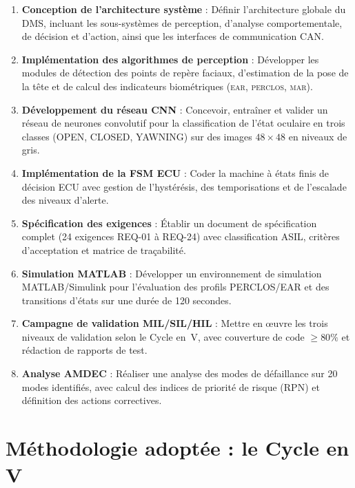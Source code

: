 \documentclass[12pt,a4paper]{report}
\begin{document}
\begin{enumerate}[label=\textbf{O\arabic*.}, leftmargin=2cm]
  \item \textbf{Conception de l'architecture syst\`eme} : D\'efinir l'architecture globale du DMS, incluant les sous-syst\`emes de perception, d'analyse comportementale, de d\'ecision et d'action, ainsi que les interfaces de communication CAN.

  \item \textbf{Impl\'ementation des algorithmes de perception} : D\'evelopper les modules de d\'etection des points de rep\`ere faciaux, d'estimation de la pose de la t\^ete et de calcul des indicateurs biom\'etriques (\textsc{ear}, \textsc{perclos}, \textsc{mar}).

  \item \textbf{D\'eveloppement du r\'eseau CNN} : Concevoir, entra\^iner et valider un r\'eseau de neurones convolutif pour la classification de l'\'etat oculaire en trois classes (OPEN, CLOSED, YAWNING) sur des images $48\times48$ en niveaux de gris.

  \item \textbf{Impl\'ementation de la FSM ECU} : Coder la machine \`a \'etats finis de d\'ecision ECU avec gestion de l'hyst\'er\'esis, des temporisations et de l'escalade des niveaux d'alerte.

  \item \textbf{Sp\'ecification des exigences} : \'Etablir un document de sp\'ecification complet (24 exigences REQ-01 \`a REQ-24) avec classification ASIL, crit\`eres d'acceptation et matrice de tra\c{c}abilit\'e.

  \item \textbf{Simulation MATLAB} : D\'evelopper un environnement de simulation MATLAB/Simulink pour l'\'evaluation des profils PERCLOS/EAR et des transitions d'\'etats sur une dur\'ee de 120 secondes.

  \item \textbf{Campagne de validation MIL/SIL/HIL} : Mettre en \oe uvre les trois niveaux de validation selon le Cycle en~V, avec couverture de code $\geq 80\%$ et r\'edaction de rapports de test.

  \item \textbf{Analyse AMDEC} : R\'ealiser une analyse des modes de d\'efaillance sur 20 modes identifi\'es, avec calcul des indices de priorit\'e de risque (RPN) et d\'efinition des actions correctives.
\end{enumerate}

\section{M\'ethodologie adopt\'ee : le Cycle en V}
\end{document}
